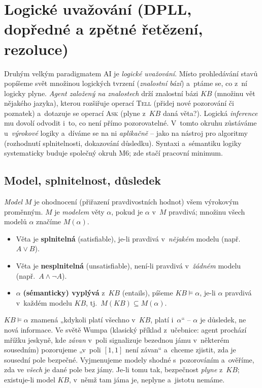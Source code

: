 \section{Logické uvažování (DPLL, dopředné a zpětné řetězení, rezoluce)}

Druhým velkým paradigmatem AI je \emph{logické uvažování}. Místo prohledávání stavů popíšeme svět množinou logických tvrzení (\emph{znalostní bází}) a~ptáme se, co z~ní logicky plyne. \emph{Agent založený na znalostech} drží znalostní bázi $KB$ (množinu vět nějakého jazyka), kterou rozšiřuje operací \textsc{Tell} (přidej nové pozorování či poznatek) a~dotazuje se operací \textsc{Ask} (plyne z~$KB$ daná věta?). Logická \emph{inference} mu dovolí odvodit i~to, co není přímo pozorovatelné. V~tomto okruhu zůstáváme u~\emph{výrokové} logiky a~díváme se na ni \emph{aplikačně} -- jako na nástroj pro algoritmy (rozhodnutí splnitelnosti, dokazování důsledku). Syntaxi a~sémantiku logiky systematicky buduje společný okruh M6; zde stačí pracovní minimum.

\subsection{Model, splnitelnost, důsledek}

\begin{definice}
\emph{Model} $M$ je ohodnocení (přiřazení pravdivostních hodnot) všem výrokovým proměnným. $M$ je \emph{modelem} věty $\alpha$, pokud je $\alpha$ v~$M$ pravdivá; množinu všech modelů $\alpha$ značíme $M(\alpha)$.
\begin{itemize}
  \item Věta je \textbf{splnitelná} (satisfiable), je-li pravdivá v~\emph{nějakém} modelu (např.\ $A\vee B$).
  \item Věta je \textbf{nesplnitelná} (unsatisfiable), není-li pravdivá v~\emph{žádném} modelu (např.\ $A\wedge\neg A$).
  \item $\alpha$ \textbf{(sémanticky) vyplývá} z~$KB$ (entails), píšeme $KB\models\alpha$, je-li $\alpha$ pravdivá v~každém modelu $KB$, tj.\ $M(KB)\subseteq M(\alpha)$.
\end{itemize}
\end{definice}

\begin{intuice}
$KB\models\alpha$ znamená „kdykoli platí všechno v~$KB$, platí i~$\alpha$`` -- $\alpha$ je důsledek, ne nová informace. Ve světě Wumpa (klasický příklad z~učebnice: agent prochází mřížku jeskyně, kde \emph{závan} v~poli signalizuje bezednou jámu v~některém sousedním) pozorujeme „v~poli $[1,1]$ není závan`` a~chceme zjistit, zda je sousední pole bezpečné. Vyjmenujeme modely shodné s~pozorováním a~ověříme, zda ve \emph{všech} je dané pole bez jámy. Je-li tomu tak, bezpečnost \emph{plyne} z~$KB$; existuje-li model $KB$, v~němž tam jáma je, neplyne a~jistotu nemáme.
\end{intuice}

